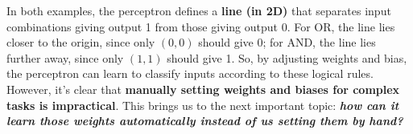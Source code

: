 \highspace
In both examples, the perceptron defines a \textbf{line (in 2D)} that separates input combinations giving output 1 from those giving output 0. For OR, the line lies closer to the origin, since only $\left(0,0\right)$ should give 0; for AND, the line lies further away, since only $\left(1,1\right)$ should give 1. So, by adjusting weights and bias, the perceptron can learn to classify inputs according to these logical rules. However, it's clear that \textbf{manually setting weights and biases for complex tasks is impractical}. This brings us to the next important topic: \textbf{\emph{how can it learn those weights automatically instead of us setting them by hand?}}